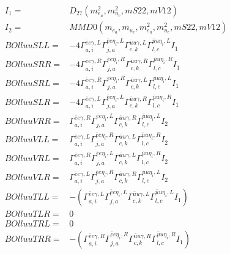 \documentclass[A4,landscape]{article}
\begin{document}
\begin{align} 
I_1 = & D_{27}(m^2_{e_{{a}}}, m^2_{u_{{c}}}, mS22, mV12) \\ 
I_2 = & MMD0(m_{e_{{a}}}, m_{u_{{c}}}, m^2_{e_{{a}}}, m^2_{u_{{c}}}, mS22, mV12) \\ 
  BOlluuSLL= & -4  \Gamma^{\bar{e}e \gamma ,L}_{a, i} \Gamma^{\bar{e}e \eta_i ,L}_{j, a} \Gamma^{\bar{u}u \gamma ,L}_{c, k} \Gamma^{\bar{u}u \eta_i ,L}_{l, c} I_1 \\ 
  BOlluuSRR= & -4  \Gamma^{\bar{e}e \gamma ,R}_{a, i} \Gamma^{\bar{e}e \eta_i ,R}_{j, a} \Gamma^{\bar{u}u \gamma ,R}_{c, k} \Gamma^{\bar{u}u \eta_i ,R}_{l, c} I_1 \\ 
  BOlluuSRL= & -4  \Gamma^{\bar{e}e \gamma ,R}_{a, i} \Gamma^{\bar{e}e \eta_i ,R}_{j, a} \Gamma^{\bar{u}u \gamma ,L}_{c, k} \Gamma^{\bar{u}u \eta_i ,L}_{l, c} I_1 \\ 
  BOlluuSLR= & -4  \Gamma^{\bar{e}e \gamma ,L}_{a, i} \Gamma^{\bar{e}e \eta_i ,L}_{j, a} \Gamma^{\bar{u}u \gamma ,R}_{c, k} \Gamma^{\bar{u}u \eta_i ,R}_{l, c} I_1 \\ 
  BOlluuVRR= &  \Gamma^{\bar{e}e \gamma ,R}_{a, i} \Gamma^{\bar{e}e \eta_i ,L}_{j, a} \Gamma^{\bar{u}u \gamma ,R}_{c, k} \Gamma^{\bar{u}u \eta_i ,L}_{l, c} I_2 \\ 
  BOlluuVLL= &  \Gamma^{\bar{e}e \gamma ,L}_{a, i} \Gamma^{\bar{e}e \eta_i ,R}_{j, a} \Gamma^{\bar{u}u \gamma ,L}_{c, k} \Gamma^{\bar{u}u \eta_i ,R}_{l, c} I_2 \\ 
  BOlluuVRL= &  \Gamma^{\bar{e}e \gamma ,R}_{a, i} \Gamma^{\bar{e}e \eta_i ,L}_{j, a} \Gamma^{\bar{u}u \gamma ,L}_{c, k} \Gamma^{\bar{u}u \eta_i ,R}_{l, c} I_2 \\ 
  BOlluuVLR= &  \Gamma^{\bar{e}e \gamma ,L}_{a, i} \Gamma^{\bar{e}e \eta_i ,R}_{j, a} \Gamma^{\bar{u}u \gamma ,R}_{c, k} \Gamma^{\bar{u}u \eta_i ,L}_{l, c} I_2 \\ 
  BOlluuTLL= & -( \Gamma^{\bar{e}e \gamma ,L}_{a, i} \Gamma^{\bar{e}e \eta_i ,L}_{j, a} \Gamma^{\bar{u}u \gamma ,L}_{c, k} \Gamma^{\bar{u}u \eta_i ,L}_{l, c} I_1) \\ 
  BOlluuTLR= & 0 \\ 
  BOlluuTRL= & 0 \\ 
  BOlluuTRR= & -( \Gamma^{\bar{e}e \gamma ,R}_{a, i} \Gamma^{\bar{e}e \eta_i ,R}_{j, a} \Gamma^{\bar{u}u \gamma ,R}_{c, k} \Gamma^{\bar{u}u \eta_i ,R}_{l, c} I_1) \\ 
\end{align} 
\end{document}
